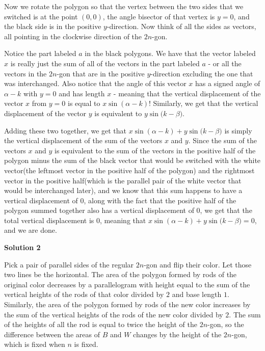 \begin{enumerate}
 Now we rotate the polygon so that the vertex between the two sides that we switched is at the point $(0,0)$, the angle bisector of that vertex is $y=0$, and the black side is in the positive $y$-direction. Now think of all the sides as vectors, all pointing in the clockwise direction of the $2n$-gon.

 Notice the part labeled $a$ in the black polygons. We have that the vector labeled $x$ is really just the sum of all of the vectors in the part labeled $a$ - or all the vectors in the $2n$-gon that are in the positive $y$-direction excluding the one that was interchanged. Also notice that the angle of this vector $x$ has a signed angle of $\alpha{}-k$ with $y=0$ and has length $x$ - meaning that the vertical displacement of the vector $x$ from $y=0$ is equal to $x\sin{(\alpha{}-k)}$! Similarly, we get that the vertical displacement of the vector $y$ is equivalent to $y\sin{(k-\beta{}})$. 

 Adding these two together, we get that $x\sin{(\alpha{}-k)}+y\sin{(k-\beta{}})$ is simply the vertical displacement of the sum of the vectors $x$ and $y$. Since the sum of the vectors $x$ and $y$ is equivalent to the sum of the vectors in the positive half of the polygon minus the sum of the black vector that would be switched with the white vector(the leftmost vector in the positive half of the polygon) and the rightmost vector in the positive half(which is the parallel pair of the white vector that would be interchanged later), and we know that this sum happens to have a vertical displacement of $0$, along with the fact that the positive half of the polygon summed together also has a vertical displacement of $0$, we get that the total vertical displacement is $0$, meaning that $x\sin{(\alpha{}-k)}+y\sin{(k-\beta{}})=0$, and we are done.

 


 



\textbf{Solution 2}

Pick a pair of parallel sides of the regular $2n$-gon and flip their color. Let those two lines be the horizontal. The area of the polygon formed by rods of the original color decreases by a parallelogram with height equal to the sum of the vertical heights of the rods of that color divided by $2$ and base length $1$. Similarly, the area of the polygon formed by rods of the new color increases by the sum of the vertical heights of the rods of the new color divided by $2$. The sum of the heights of all the rod is equal to twice the height of the $2n$-gon, so the difference between the areas of $B$ and $W$ changes by the height of the $2n$-gon, which is fixed when $n$ is fixed.


\end{enumerate}

